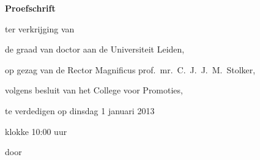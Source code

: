 \begin{titlepage}

\begin{center}

\vspace*{2\bigskipamount}

{\makeatletter
\titlestyle\bfseries\LARGE\@title
\makeatother}

{\makeatletter
\ifx\@subtitle\undefined\else
    \bigskip
    \titlefont\titleshape\Large\@subtitle
\fi
\makeatother}

\end{center}

\cleardoublepage
\thispagestyle{empty}

\begin{center}


\vspace*{2\bigskipamount}

{\makeatletter
\titlestyle\bfseries\LARGE\@title
\makeatother}

{\makeatletter
\ifx\@subtitle\undefined\else
    \bigskip
    \titlefont\titleshape\Large\@subtitle
\fi
\makeatother}

\vfill


{\Large\titlefont\bfseries Proefschrift}

\bigskip
\bigskip

ter verkrijging van 

de graad van doctor aan de Universiteit Leiden,

op gezag van de Rector Magnificus prof.~mr.~C.~J.~J.~M.~Stolker,

volgens besluit van het College voor Promoties,

te verdedigen op dinsdag 1 januari 2013 

klokke 10:00 uur

\bigskip
\bigskip

door

\bigskip
\bigskip

\makeatletter
{\Large\titlefont\bfseries\@firstname\ {\titleshape\@lastname}}
\makeatother


\end{center}
\end{titlepage}
